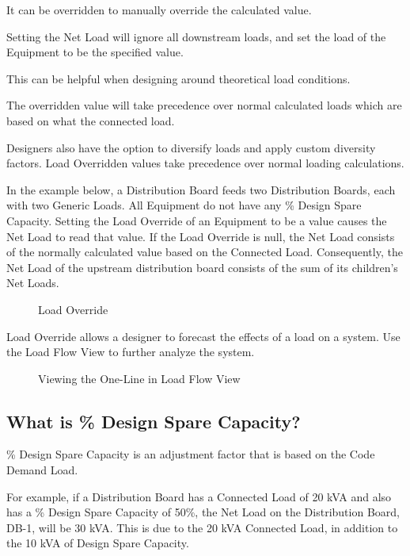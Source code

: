 \documentclass[letterpaper,10pt,english]{sphinxmanual}
\begin{document}
It can be overridden to manually override the calculated value.

Setting the Net Load will ignore all downstream loads, and set the load of the Equipment to be the specified value.

This can be helpful when designing around theoretical load conditions.

The overridden value will take precedence over normal calculated loads which are based on what the connected load.

Designers also have the option to diversify loads and apply custom diversity factors.  Load Overridden values take precedence over normal loading calculations.

In the example below, a Distribution Board feeds two Distribution Boards, each with two Generic Loads.  All Equipment do not have any \% Design Spare Capacity.  Setting the Load Override of an Equipment to be a value causes the Net Load to read that value.  If the Load Override is null, the Net Load consists of the normally calculated value based on the Connected Load.  Consequently, the Net Load of the upstream distribution board consists of the sum of its children’s Net Loads.

\begin{figure}[H]
\centering
\capstart

\noindent{}
\caption{Load Override}\label{\detokenize{docs/faq:id4}}\end{figure}

Load Override allows a designer to forecast the effects of a load on a system.  Use the Load Flow View to further analyze the system.

\begin{figure}[H]
\centering
\capstart

\noindent{}
\caption{Viewing the One-Line in Load Flow View}\label{\detokenize{docs/faq:id5}}\end{figure}


\subsection{What is \% Design Spare Capacity?}
\label{\detokenize{docs/faq:what-is-design-spare-capacity}}\label{\detokenize{docs/faq:design-spare-capacity}}
\% Design Spare Capacity is an adjustment factor that is based on the Code Demand Load.

For example, if a Distribution Board has a Connected Load of 20 kVA and also has a \% Design Spare Capacity of 50\%, the Net Load on the Distribution Board, DB-1, will be 30 kVA.  This is due to the 20 kVA Connected Load, in addition to the 10 kVA of Design Spare Capacity.
\end{document}
